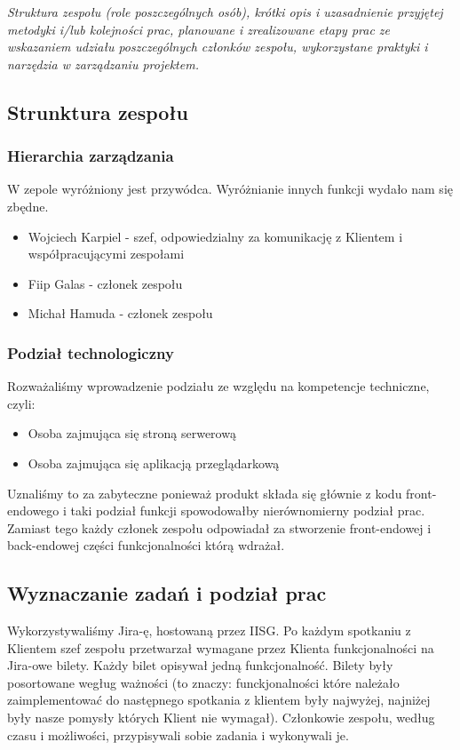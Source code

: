 \documentclass[polish,12pt]{aghthesis}
\begin{document}
\emph{Struktura zespołu (role poszczególnych osób), krótki opis i
  uzasadnienie przyjętej metodyki i/lub kolejności prac, planowane i
  zrealizowane etapy prac ze wskazaniem udziału poszczególnych
  członków zespołu, wykorzystane praktyki i narzędzia w zarządzaniu
  projektem.}
  
\subsection{Strunktura zespołu}
\subsubsection{Hierarchia zarządzania}
W zepole wyróżniony jest przywódca. Wyróżnianie innych funkcji wydało nam się zbędne.
\begin{itemize}
    \item Wojciech Karpiel - szef, odpowiedzialny za komunikację z Klientem i współpracującymi zespołami
    \item Fiip Galas - członek zespołu
    \item Michał Hamuda - członek zespołu
\end{itemize}
\subsubsection{Podział technologiczny}
Rozważaliśmy wprowadzenie podziału ze względu na kompetencje techniczne, czyli:
\begin{itemize}
    \item Osoba zajmująca się stroną serwerową
    \item Osoba zajmująca się aplikacją przeglądarkową
\end{itemize}
Uznaliśmy to za zabyteczne ponieważ produkt składa się głównie z kodu front-endowego i taki podział funkcji spowodowałby nierównomierny podział prac. Zamiast tego każdy członek zespołu odpowiadał za stworzenie front-endowej i back-endowej części funkcjonalności którą wdrażał.

\subsection{Wyznaczanie zadań i podział prac}
Wykorzystywaliśmy Jira-ę, hostowaną przez IISG. Po każdym spotkaniu z Klientem szef zespołu przetwarzał wymagane przez Klienta funkcjonalności na Jira-owe bilety. Każdy bilet opisywał jedną funkcjonalność. Bilety były posortowane wegług ważności (to znaczy: funckjonalności które należało zaimplementować do następnego spotkania z klientem były najwyżej, najniżej były nasze pomysły których Klient nie wymagał). Członkowie zespołu, według czasu i możliwości, przypisywali sobie zadania i wykonywali je.
\end{document}
